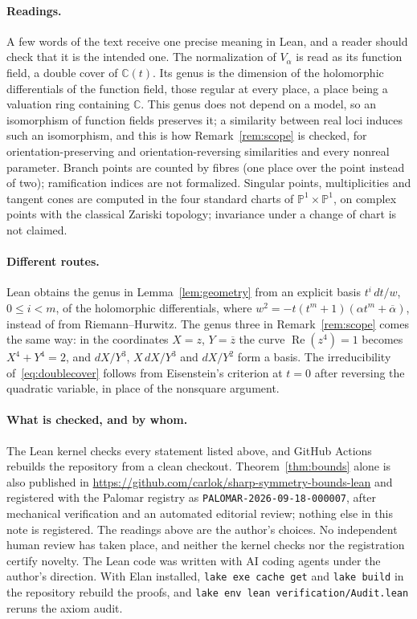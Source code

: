 \documentclass[11pt,a4paper]{article}
\theoremstyle{definition}
\newcommand{\C}{\mathbb{C}}
\newcommand{\PP}{\mathbb{P}}
\DeclareMathOperator{\Rea}{Re}
\begin{document}
\paragraph{Readings.}
A few words of the text receive one precise meaning in Lean, and a reader
should check that it is the intended one. The normalization of $V_\alpha$ is
read as its function field, a double cover of $\C(t)$. Its genus is the
dimension of the holomorphic differentials of the function field, those
regular at every place, a place being a valuation ring containing $\C$. This
genus does not depend on a model, so an isomorphism of function fields
preserves it; a similarity between real loci induces such an isomorphism, and
this is how Remark~\ref{rem:scope} is checked, for orientation-preserving and
orientation-reversing similarities and every nonreal parameter. Branch points
are counted by fibres (one place over the point instead of two); ramification
indices are not formalized. Singular points, multiplicities and tangent cones
are computed in the four standard charts of $\PP^1\times\PP^1$, on complex
points with the classical Zariski topology; invariance under a change of
chart is not claimed.

\paragraph{Different routes.}
Lean obtains the genus in Lemma~\ref{lem:geometry} from an explicit basis
$t^i\,dt/w$, $0\le i<m$, of the holomorphic differentials, where
$w^2=-t(t^m+1)(\alpha t^m+\overline\alpha)$, instead of from Riemann--Hurwitz. %
The genus three in Remark~\ref{rem:scope} comes the same way: in the
coordinates $X=z$, $Y=\overline z$ the curve $\Rea(z^4)=1$ becomes
$X^4+Y^4=2$, and $dX/Y^3$, $X\,dX/Y^3$ and $dX/Y^2$ form a basis. The
irreducibility of~\eqref{eq:doublecover} follows from Eisenstein's criterion at
$t=0$ after reversing the quadratic variable, in place of the nonsquare
argument.

\paragraph{What is checked, and by whom.}
The Lean kernel checks every statement listed above, and GitHub Actions
rebuilds the repository from a clean checkout. Theorem~\ref{thm:bounds} alone
is also published in \url{https://github.com/carlok/sharp-symmetry-bounds-lean}
and registered with the Palomar registry as
\texttt{PALOMAR-2026-09-18-000007}, after mechanical verification and an %
automated editorial review; nothing else in this note is registered. The
readings above are the author's choices. No independent human review has
taken place, and neither the kernel checks nor the registration certify
novelty. The Lean code was written with AI coding agents under the author's
direction. With Elan installed, \texttt{lake exe cache get} and
\texttt{lake build} in the repository rebuild the proofs, and
\texttt{lake env lean verification/Audit.lean} reruns the axiom audit.
\end{document}
